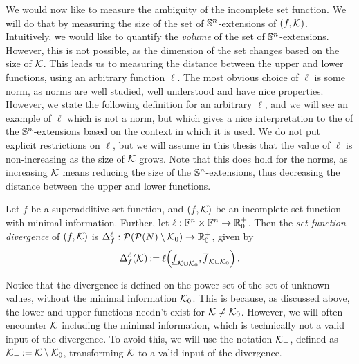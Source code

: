 We would now like to measure the ambiguity of the incomplete set function.
We will do that by measuring the size of the set of $ \cSuperadditive $-extensions of $ \left( f, \k \right) $.
Intuitively, we would like to quantify the \emph{volume} of the set of $ \cSuperadditive $-extensions.
However, this is not possible, as the dimension of the set changes based on the size of $ \k$.
This leads us to measuring the distance between the upper and lower functions, using an arbitrary function $ \ell $.
The most obvious choice of $ \ell $ is some norm, as norms are well studied, well understood and have nice properties.
However, we state the following definition for an arbitrary $ \ell $, and we will see an example of $ \ell $ which is not a norm, but which gives a nice interpretation to the  of the $ \cSuperadditive $-extensions based on the context in which it is used.
We do not put explicit restrictions on $ \ell $, but we will assume in this thesis that the value of $ \ell $ is non-increasing as the size of $ \k $ grows.
Note that this does hold for the norms, as increasing $ \k $ means reducing the size of the $ \cSuperadditive $-extensions, thus decreasing the distance between the upper and lower functions.

\begin{defi}[Divergence]
  Let $ f $ be a superadditive set function, and $ \left( f, \k \right) $ be an incomplete set function with minimal information.
  Further, let $ \ell: \funcs \times \funcs \to \R^+_0 $.
  Then the \emph{set function divergence} of $ \left( f, \k \right) $ is $ \Delta_f^{\ell}: \pot{\pot N \setminus \k_0} \to \R^+_0 $, given by \[
    \divg \ell \k \deq \fce{\ell}{\lf[\k \cup \k_0] f, \uf[\k \cup \k_0] f}.
  \]
\end{defi}


Notice that the divergence is defined on the power set of the set of unknown values, without the minimal information $ \k_0 $.
This is because, as discussed above, the lower and upper functions needn't exist for $ \k \not\supseteq \k_0 $.
However, we will often encounter $ \k $ including the minimal information, which is technically not a valid input of the divergence.
To avoid this, we will use the notation $ \k_- $, defined as $ \k_- \deq \k \setminus \k_0 $, transforming $ \k $ to a valid input of the divergence.

